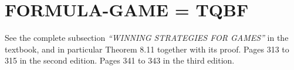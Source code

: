 \section{FORMULA-GAME = TQBF}

See the complete subsection \emph{``WINNING STRATEGIES FOR GAMES''} in the
textbook, and in particular Theorem 8.11 together with its proof.
Pages 313 to 315 in the second edition. Pages 341 to 343 in the third
edition.
